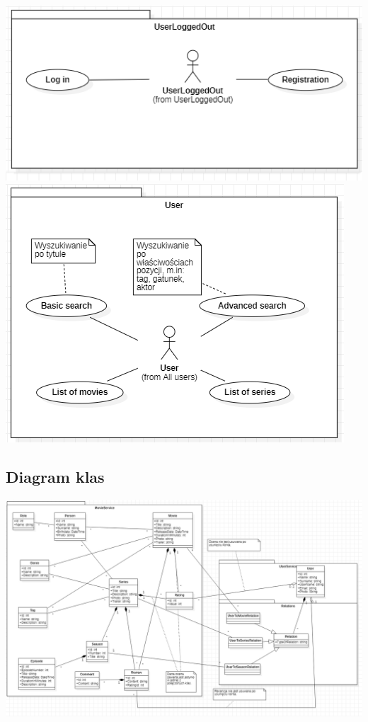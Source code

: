 \documentclass[12pt]{article}
\begin{document}
\begin{flushleft}
			\includegraphics[scale=0.9]{UseCase_UserNotLoggedIn.png} \linebreak
			\includegraphics[scale=0.9]{UseCase_User.png} \linebreak
		
		\subsection{Diagram klas}
			\begin{center}
				\includegraphics[scale=0.5]{Class_FilmsDataBase.png}
			\end{center}
		

\end{flushleft}
\end{document}
